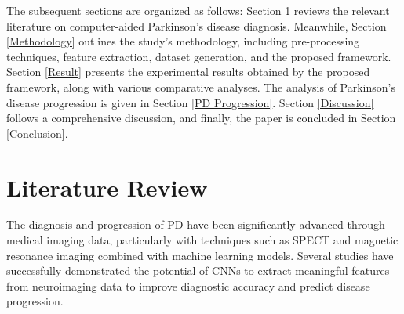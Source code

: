 \documentclass[twocolumn]{article}
\begin{document}
The subsequent sections are organized as follows: Section \ref{Literature Review} reviews the relevant literature on computer-aided Parkinson's disease diagnosis. Meanwhile, Section \ref{Methodology} outlines the study's methodology, including pre-processing techniques, feature extraction, dataset generation, and the proposed framework. Section \ref{Result} presents the experimental results obtained by the proposed framework, along with various comparative analyses. The analysis of Parkinson's disease progression is given in Section \ref{PD Progression}. Section \ref{Discussion} follows a comprehensive discussion, and finally, the paper is concluded in Section \ref{Conclusion}.




\section{Literature Review}
\label{Literature Review}

The diagnosis and progression of PD have been significantly advanced through medical imaging data, particularly with techniques such as SPECT and magnetic resonance imaging combined with machine learning models. Several studies have successfully demonstrated the potential of CNNs to extract meaningful features from neuroimaging data to improve diagnostic accuracy and predict disease progression. 
\end{document}
